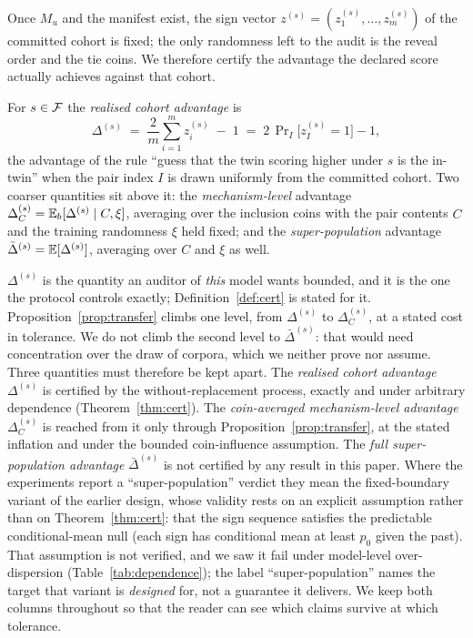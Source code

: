 Once $M_u$ and the manifest exist, the sign vector $z^{(s)} = (z_1^{(s)},\dots,
z_m^{(s)})$ of the committed cohort is fixed; the only randomness left to the audit
is the reveal order and the tie coins. We therefore certify the advantage the
declared score actually achieves against that cohort.

\begin{definition}\label{def:delta}
For $s\in\mathcal{F}$ the \emph{realised cohort advantage} is
\begin{equation}\label{eq:delta}
\Delta^{(s)} \;=\; \frac{2}{m}\sum_{i=1}^{m} z_i^{(s)} \;-\; 1
\;=\; 2\,\Pr\nolimits_{I}\bigl[z_I^{(s)}=1\bigr] - 1 ,
\end{equation}
the advantage of the rule ``guess that the twin scoring higher under $s$ is the
in-twin'' when the pair index $I$ is drawn uniformly from the committed cohort. Two
coarser quantities sit above it: the \emph{mechanism-level} advantage
$\Delta^{(s)}_C = \mathbb{E}_b[\Delta^{(s)} \mid C, \xi]$, averaging over the inclusion
coins with the pair contents $C$ and the training randomness $\xi$ held fixed; and the
\emph{super-population} advantage $\bar\Delta^{(s)} = \mathbb{E}[\Delta^{(s)}]$, averaging
over $C$ and $\xi$ as well.
\end{definition}

$\Delta^{(s)}$ is the quantity an auditor of \emph{this} model wants bounded, and it
is the one the protocol controls exactly; Definition~\ref{def:cert} is stated for it.
Proposition~\ref{prop:transfer} climbs one level, from $\Delta^{(s)}$ to
$\Delta^{(s)}_C$, at a stated cost in tolerance. We do not climb the second level to
$\bar\Delta^{(s)}$: that would need concentration over the draw of corpora, which we
neither prove nor assume. Three quantities must therefore be kept apart. The
\emph{realised cohort advantage} $\Delta^{(s)}$ is certified by the without-replacement
process, exactly and under arbitrary dependence (Theorem~\ref{thm:cert}). The
\emph{coin-averaged mechanism-level advantage} $\Delta^{(s)}_C$ is reached from it only
through Proposition~\ref{prop:transfer}, at the stated inflation and under the bounded
coin-influence assumption. The \emph{full super-population advantage}
$\bar\Delta^{(s)}$ is not certified by any result in this paper. Where the experiments
report a ``super-population'' verdict they mean the fixed-boundary variant of the earlier
design, whose validity rests on an explicit assumption rather than on
Theorem~\ref{thm:cert}: that the sign sequence satisfies the predictable
conditional-mean null (each sign has conditional mean at least $p_0$ given the past).
That assumption is not verified, and we saw it fail under model-level over-dispersion
(Table~\ref{tab:dependence}); the label ``super-population'' names the target that
variant is \emph{designed} for, not a guarantee it delivers. We keep both columns
throughout so that the reader can see which claims survive at which tolerance.

